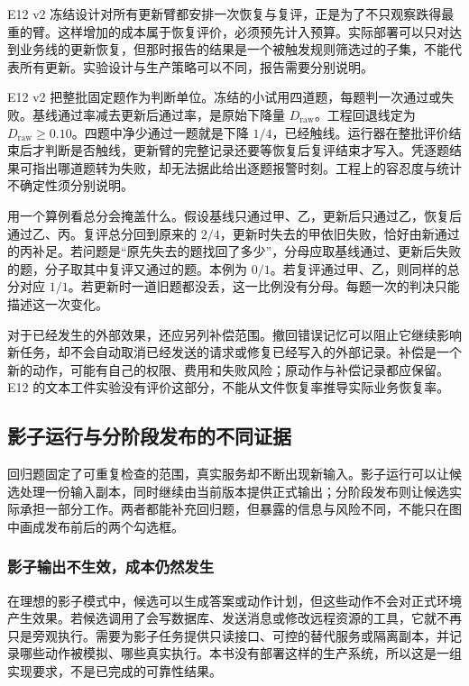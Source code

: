E12 v2 冻结设计对所有更新臂都安排一次恢复与复评，正是为了不只观察跌得最重的臂。这样增加的成本属于恢复评价，必须预先计入预算。实际部署可以只对达到业务线的更新恢复，但那时报告的结果是一个被触发规则筛选过的子集，不能代表所有更新。实验设计与生产策略可以不同，报告需要分别说明。

E12 v2 把整批固定题作为判断单位。冻结的小试用四道题，每题判一次通过或失败。基线通过率减去更新后通过率，是原始下降量 $D_{\mathrm{raw}}$。工程回退线定为 $D_{\mathrm{raw}}\geq 0.10$。四题中净少通过一题就是下降 $1/4$，已经触线。运行器在整批评价结束后才判断是否触线，更新臂的完整记录还要等恢复后复评结束才写入。凭逐题结果可指出哪道题转为失败，却无法据此给出逐题报警时刻。工程上的容忍度与统计不确定性须分别说明。

用一个算例看总分会掩盖什么。假设基线只通过甲、乙，更新后只通过乙，恢复后通过乙、丙。复评总分回到原来的 $2/4$，更新时失去的甲依旧失败，恰好由新通过的丙补足。若问题是“原先失去的题找回了多少”，分母应取基线通过、更新后失败的题，分子取其中复评又通过的题。本例为 $0/1$。若复评通过甲、乙，则同样的总分对应 $1/1$。若更新时一道旧题都没丢，这一比例没有分母。每题一次的判决只能描述这一次变化。

对于已经发生的外部效果，还应另列补偿范围。撤回错误记忆可以阻止它继续影响新任务，却不会自动取消已经发送的请求或修复已经写入的外部记录。补偿是一个新的动作，可能有自己的权限、费用和失败风险；原动作与补偿记录都应保留。E12 的文本工件实验没有评价这部分，不能从文件恢复率推导实际业务恢复率。

\subsection{影子运行与分阶段发布的不同证据}
\label{sec:ch14-shadow-evidence}

回归题固定了可重复检查的范围，真实服务却不断出现新输入。影子运行可以让候选处理一份输入副本，同时继续由当前版本提供正式输出；分阶段发布则让候选实际承担一部分工作。两者都能补充回归题，但暴露的信息与风险不同，不能只在图中画成发布前后的两个勾选框。

\subsubsection{影子输出不生效，成本仍然发生}

在理想的影子模式中，候选可以生成答案或动作计划，但这些动作不会对正式环境产生效果。若候选调用了会写数据库、发送消息或修改远程资源的工具，它就不再只是旁观执行。需要为影子任务提供只读接口、可控的替代服务或隔离副本，并记录哪些动作被模拟、哪些真实执行。本书没有部署这样的生产系统，所以这是一组实现要求，不是已完成的可靠性结果。

